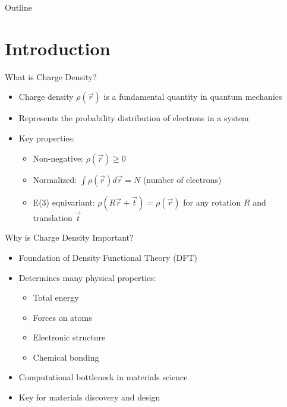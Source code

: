 \begin{frame}
    \titlepage
\end{frame}

\begin{frame}{Outline}
    \tableofcontents
\end{frame}

\section{Introduction}

\begin{frame}{What is Charge Density?}
    \begin{itemize}
        \item Charge density $\rho(\vec{r})$ is a fundamental quantity in quantum mechanics
        \item Represents the probability distribution of electrons in a system
        \item Key properties:
        \begin{itemize}
            \item Non-negative: $\rho(\vec{r}) \geq 0$
            \item Normalized: $\int \rho(\vec{r}) d\vec{r} = N$ (number of electrons)
            \item E(3) equivariant: $\rho(R\vec{r} + \vec{t}) = \rho(\vec{r})$ for any rotation $R$ and translation $\vec{t}$
        \end{itemize}
    \end{itemize}
\end{frame}

\begin{frame}{Why is Charge Density Important?}
    \begin{itemize}
        \item Foundation of Density Functional Theory (DFT)
        \item Determines many physical properties:
        \begin{itemize}
            \item Total energy
            \item Forces on atoms
            \item Electronic structure
            \item Chemical bonding
        \end{itemize}
        \item Computational bottleneck in materials science
        \item Key for materials discovery and design
    \end{itemize}
\end{frame}

